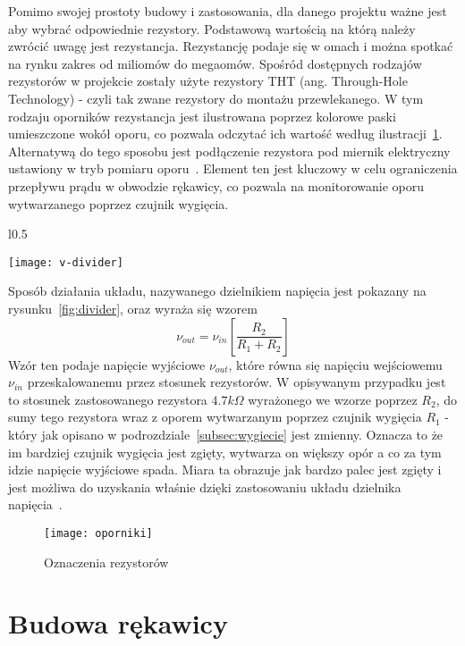 	Pomimo swojej prostoty budowy i zastosowania, dla danego projektu ważne jest aby wybrać odpowiednie rezystory. Podstawową wartością na którą należy zwrócić uwagę jest rezystancja. Rezystancję podaje się w omach i można spotkać na rynku zakres od miliomów do megaomów. Spośród dostępnych rodzajów rezystorów w projekcie zostały użyte rezystory THT (ang. Through-Hole Technology) - czyli tak zwane rezystory do montażu przewlekanego. W tym rodzaju oporników rezystancja jest ilustrowana poprzez kolorowe paski umieszczone wokół oporu, co pozwala odczytać ich wartość według ilustracji~\ref{fig:oporniki}. Alternatywą do tego sposobu jest podłączenie rezystora pod miernik elektryczny ustawiony w tryb pomiaru oporu~\cite{rezystor}. Element ten jest kluczowy w celu ograniczenia przepływu prądu w obwodzie rękawicy, co pozwala na monitorowanie oporu wytwarzanego poprzez czujnik wygięcia. 
	
\begin{wrapfigure}{l}{0.5\textwidth}
\begin{center}
\texttt{[image: v-divider]}
\caption{Układ dzielnika napięcia~\cite{r2}}
\label{fig:divider}
\end{center}
\end{wrapfigure}
	
Sposób działania układu, nazywanego dzielnikiem napięcia jest pokazany na rysunku~\ref{fig:divider}, oraz wyraża się wzorem
	$$
		\nu_{out} = \nu_{in}\left[ \frac{R_2}{R_1+R_2}\right]
	$$	
Wzór ten podaje napięcie wyjściowe $\nu_{out}$, które równa się napięciu wejściowemu $\nu_{in}$ przeskalowanemu przez stosunek rezystorów. W opisywanym przypadku jest to stosunek zastosowanego rezystora $4.7 k\Omega$ wyrażonego we wzorze poprzez $R_2$, do sumy tego rezystora wraz z oporem wytwarzanym poprzez czujnik wygięcia $R_1$ - który jak opisano w podrozdziale~\ref{subsec:wygiecie} jest zmienny. Oznacza to że im bardziej czujnik wygięcia jest zgięty, wytwarza on większy opór a co za tym idzie napięcie wyjściowe spada. Miara ta obrazuje jak bardzo palec jest zgięty i jest możliwa do uzyskania właśnie dzięki zastosowaniu układu dzielnika napięcia~\cite{v-divider}.
\begin{figure}[h]
\centering
\texttt{[image: oporniki]}
\caption{Oznaczenia rezystorów~\cite{r1}}
\label{fig:oporniki}
\end{figure}
\section{Budowa rękawicy}
\label{sec:budowa}

